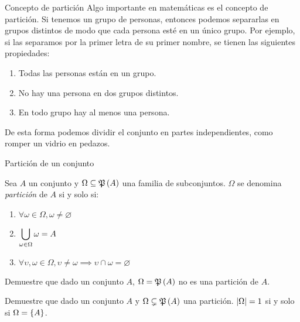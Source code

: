 \begin{frame}{Concepto de partición}
	Algo importante en matemáticas es el concepto de partición. Si tenemos un grupo de personas, entonces podemos separarlas en grupos distintos de modo que cada persona esté en un único grupo. Por ejemplo, si las separamos por la primer letra de su primer nombre, se tienen las siguientes propiedades:
	\begin{enumerate}
		\item Todas las personas están en un grupo.
		\item No hay una persona en dos grupos distintos.
		\item En todo grupo hay al menos una persona.
	\end{enumerate}
	De esta forma podemos dividir el conjunto en partes independientes, como romper un vidrio en pedazos.
\end{frame}
\begin{frame}{Partición de un conjunto}
	\begin{mdefinition}[Partición]
		Sea $ A $ un conjunto y $ \Omega\subseteq\mpow{A} $ una familia de subconjuntos. $ \Omega $ se denomina \emph{partición} de $ A $ si y solo si:
		\begin{enumerate}
			\item $ \forall\omega\in\Omega, \omega\neq\varnothing $
			\item $ \displaystyle\bigcup_{\omega\in\Omega}\omega = A $
			\item $ \forall \upsilon, \omega\in\Omega, \upsilon\neq\omega\implies\upsilon\cap\omega =\varnothing $
		\end{enumerate}
	\end{mdefinition}
\end{frame}
\begin{frame}
	\begin{exercise}
		Demuestre que dado un conjunto $ A $, $ \Omega =\mpow{A} $ no es una partición de $ A $.
	\end{exercise}
\end{frame}
\begin{frame}
	
\end{frame}
\begin{frame}
	\begin{exercise}
		Demuestre que dado un conjunto $ A $ y $ \Omega\subsetneq\mpow{A} $ una partición. $ \left\vert \Omega \right\vert = 1 $ si y solo si $ \Omega =\left\{ A \right\} $.
	\end{exercise}
\end{frame}
\begin{frame}
	
\end{frame}
